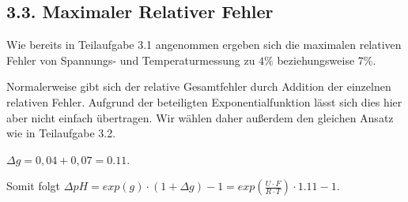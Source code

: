 \documentclass[12pt,a4paper]{article}
\begin{document}
\subsection*{3.3. Maximaler Relativer Fehler}
Wie bereits in Teilaufgabe 3.1 angenommen ergeben sich die maximalen relativen Fehler von Spannungs- und Temperaturmessung zu $4\%$ beziehungsweise $7\%$. 

Normalerweise gibt sich der relative Gesamtfehler durch Addition der einzelnen relativen Fehler. Aufgrund der beteiligten Exponentialfunktion lässt sich dies hier aber nicht einfach übertragen. Wir wählen daher außerdem den gleichen Ansatz wie in Teilaufgabe 3.2.

$\Delta g = 0,04 + 0,07 =0.11 $.
 
Somit folgt $\Delta pH = exp(g) \cdot (1 + \Delta g) - 1 = exp\left(\frac{U \cdot F}{R \cdot T}\right) \cdot 1.11 -1$.
\end{document}

